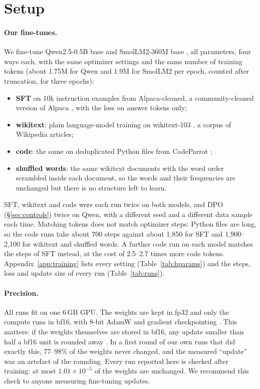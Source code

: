 \section{Setup}
\label{sec:setup}

\paragraph{Our fine-tunes.} We fine-tune Qwen2.5-0.5B base \citep{qwen2.5}
and SmolLM2-360M base \citep{allal2025smollm2}, all parameters, four ways
each, with the same optimizer settings and the same number of training tokens
(about 1.75M for Qwen and 1.9M for SmolLM2 per epoch, counted after
truncation, for three epochs):
\begin{itemize}
  \item \textbf{SFT} on 10k instruction examples from Alpaca-cleaned, a
  community-cleaned version of Alpaca \citep{taori2023alpaca}, with the loss
  on answer tokens only;
  \item \textbf{wikitext}: plain language-model training on wikitext-103
  \citep{merity2017pointer}, a corpus of Wikipedia articles;
  \item \textbf{code}: the same on deduplicated Python files from CodeParrot
  \citep{codeparrot};
  \item \textbf{shuffled words}: the same wikitext documents with the word order
  scrambled inside each document, so the words and their frequencies are
  unchanged but there is no structure left to learn.
\end{itemize}
SFT, wikitext and code were each run twice on both models, and DPO
(\S\ref{sec:controls}) twice on Qwen, with a different seed and a different
data sample each time.
Matching tokens does not match optimizer steps: Python files are long, so the
code runs take about 700 steps against about 1,850 for SFT and 1,900--2,100
for wikitext and shuffled words. A further code run on each model matches the
steps of SFT instead, at the cost of 2.5--2.7 times more code tokens.
Appendix~\ref{app:training} lists every setting (Table~\ref{tab:hparams}) and
the steps, loss and update size of every run (Table~\ref{tab:runs}).

\paragraph{Precision.} All runs fit on one 6\,GB GPU. The weights are kept in
fp32 and only the compute runs in bf16, with 8-bit AdamW
\citep{dettmers2022optimizers} and gradient checkpointing
\citep{chen2016checkpointing}. This matters: if the weights themselves are
stored in bf16, any update smaller than half a bf16 unit is rounded away
\citep{zamirai2020bfloat16, zhu2025path}. In a first round of our own runs that
did exactly this, 77--98\% of the weights never changed, and the measured
``update'' was an artefact of the rounding. Every run reported here is
checked after training: at most $1.01\times10^{-5}$ of the weights are unchanged. We
recommend this check to anyone measuring fine-tuning updates.

